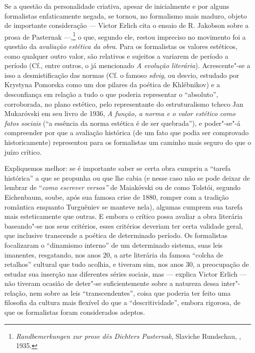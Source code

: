 Se a questão da personalidade criativa, apesar de inicialmente e por
alguns formalistas enfaticamente negada, se tornou, no formalismo mais
maduro, objeto de importante consideração --- Victor Erlich cita o ensaio
de R. Jakobson sobre a prosa de Pasternak ---,\footnote{\emph{Randbemerkungen
  zur prose dês Dichters Pasternak}, Slaviche Rundschau, , 1935.} o
que, segundo ele, restou impreciso no movimento foi a questão da
\emph{avaliação estética da obra}. Para os formalistas os valores
estéticos, como qualquer outro valor, são relativos e sujeitos a
variarem de período a período (Cf., entre outros, o já mencionado
\emph{A evolução literária}). Acrescente"-se a isso a desmistificação das
normas (Cf. o famoso \emph{sdvig}, ou desvio, estudado por Krystyna
Pomorska como um dos pilares da poética de Khlébnikov) e a desconfiança
em relação a tudo o que poderia representar o ``absoluto'', corroborada,
no plano estético, pelo representante do estruturalismo tcheco Jan
Mukaróvski em seu livro de 1936, \emph{A função, a norma e o valor
estético como fatos sociais} (``a essência da norma estética é de ser
quebrada''), e poder"-se"-á compreender por que a avaliação histórica (de
um fato que podia ser comprovado historicamente) representou para os
formalistas um caminho mais seguro do que o juízo crítico.

Expliquemos melhor: se é importante saber se certa obra cumpriu a
``tarefa histórica'' a que se propunha ou que lhe cabia (e nesse caso
não se pode deixar de lembrar de ``\emph{como escrever versos''} de
Maiakóvski ou de como Tolstói, segundo Eichenbaum, soube, após sua
famosa crise de 1880, romper com a tradição romântica enquanto
Turguêniev se manteve nela), algumas cumprem sua tarefa mais
esteticamente que outras. E embora o crítico possa avaliar a obra
literária baseando"-se nos seus critérios, esses critérios deveriam ter
certa validade geral, que inclusive transcende a poética de determinado
período. Os formalistas focalizaram o ``dinamismo interno'' de um
determinado sistema, suas leis imanentes, resgatando, nos anos 20, a
arte literária da famosa ``colcha de retalhos'' cultural que tudo
acolhia, e tiveram sim, nos anos 30, a preocupação de estudar sua
inserção nas diferentes séries sociais, mas --- explica Victor Erlich ---
não tiveram ocasião de deter"-se suficientemente sobre a natureza dessa
inter"-relação, nem sobre as leis ``transcendentes'', coisa que poderia
ter feito uma filosofia da cultura mais flexível do que a
``descritividade'', embora rigorosa, de que os formalistas foram considerados
adeptos.

